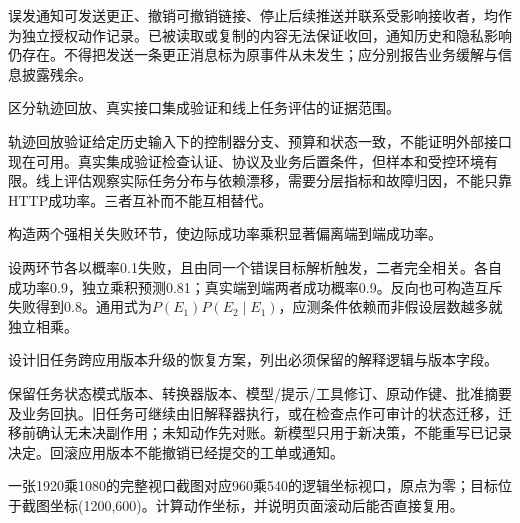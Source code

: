 \begin{exercises}
\begin{exercise}
\begin{solution}
误发通知可发送更正、撤销可撤销链接、停止后续推送并联系受影响接收者，均作为独立授权动作记录。已被读取或复制的内容无法保证收回，通知历史和隐私影响仍存在。不得把发送一条更正消息标为原事件从未发生；应分别报告业务缓解与信息披露残余。
\end{solution}
\end{exercise}

\begin{exercise} 区分轨迹回放、真实接口集成验证和线上任务评估的证据范围。

\begin{solution}
轨迹回放验证给定历史输入下的控制器分支、预算和状态一致，不能证明外部接口现在可用。真实集成验证检查认证、协议及业务后置条件，但样本和受控环境有限。线上评估观察实际任务分布与依赖漂移，需要分层指标和故障归因，不能只靠HTTP成功率。三者互补而不能互相替代。
\end{solution}
\end{exercise}

\begin{exercise} 构造两个强相关失败环节，使边际成功率乘积显著偏离端到端成功率。

\begin{solution}
设两环节各以概率0.1失败，且由同一个错误目标解析触发，二者完全相关。各自成功率0.9，独立乘积预测0.81；真实端到端两者成功概率0.9。反向也可构造互斥失败得到0.8。通用式为$P(E_1)P(E_2\mid E_1)$，应测条件依赖而非假设层数越多就独立相乘。
\end{solution}
\end{exercise}

\begin{exercise}\optional 设计旧任务跨应用版本升级的恢复方案，列出必须保留的解释逻辑与版本字段。

\begin{solution}
保留任务状态模式版本、转换器版本、模型/提示/工具修订、原动作键、批准摘要及业务回执。旧任务可继续由旧解释器执行，或在检查点作可审计的状态迁移，迁移前确认无未决副作用；未知动作先对账。新模型只用于新决策，不能重写已记录决定。回滚应用版本不能撤销已经提交的工单或通知。
\end{solution}
\end{exercise}

\begin{exercise} 一张1920乘1080的完整视口截图对应960乘540的逻辑坐标视口，原点为零；目标位于截图坐标(1200,600)。计算动作坐标，并说明页面滚动后能否直接复用。

\begin{solution}


\end{solution}
\end{exercise}
\end{exercises}

